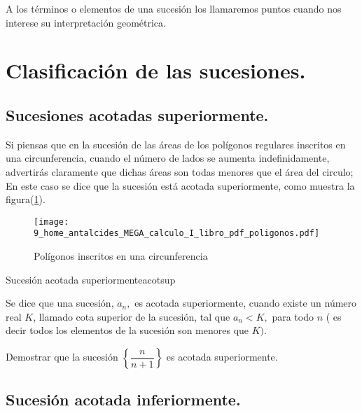 \notacion A los términos o elementos de una sucesión los llamaremos
puntos cuando nos interese su interpretación geométrica.

\section{Clasificación de las sucesiones.}

\subsection{Sucesiones acotadas superiormente.}

\begin{ejemplo}

Si piensas que en la sucesión de las áreas de los polígonos regulares
inscritos en una circunferencia, cuando el número de lados se aumenta
indefinidamente, advertirás claramente que dichas áreas son todas
menores que el área del circulo; En este caso se dice que la sucesión
está acotada superiormente, como muestra la figura(\ref{fig:poligono}).

\begin{figure}[H]
\centering\texttt{[image: 9\_home\_antalcides\_MEGA\_calculo\_I\_libro\_pdf\_poligonos.pdf]}\caption{Polígonos inscritos en una circunferencia}\label{fig:poligono}
\end{figure}

\end{ejemplo}

\begin{defi}{Sucesión acotada superiormente}{acotsup}

Se dice que una sucesión, $a_{n},$ es acotada superiormente, cuando
existe un número real $K$, llamado cota superior de la sucesión,
tal que $a_{n}<K,$ para todo $n$ ( es decir todos los elementos
de la sucesión son menores que $K).$ 

\end{defi}

\begin{ejercicio}

Demostrar que la sucesión $\left\{ \dfrac{n}{n+1}\right\} $ es acotada
superiormente.

\end{ejercicio}

\subsection{Sucesión acotada inferiormente.}


